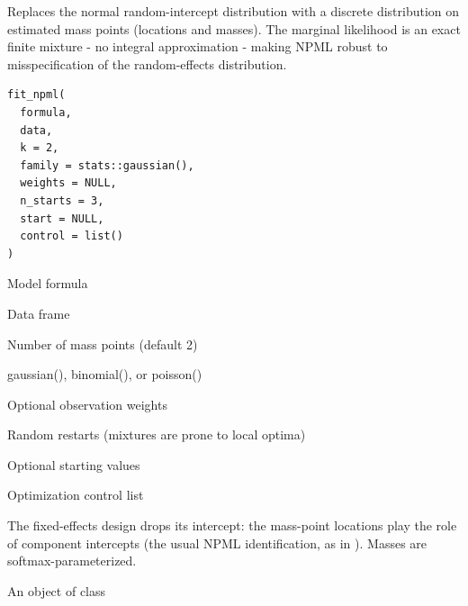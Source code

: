 \documentclass[a4paper]{book}
\begin{document}
%
\begin{Description}
Replaces the normal random-intercept distribution with a discrete
distribution on  estimated mass points (locations and masses).
The marginal likelihood is an exact finite mixture - no integral
approximation - making NPML robust to misspecification of the
random-effects distribution.
\end{Description}
%
\begin{Usage}
\begin{verbatim}
fit_npml(
  formula,
  data,
  k = 2,
  family = stats::gaussian(),
  weights = NULL,
  n_starts = 3,
  start = NULL,
  control = list()
)
\end{verbatim}
\end{Usage}
%
\begin{Arguments}
\begin{ldescription}
\item[\code{formula}] Model formula 

\item[\code{data}] Data frame

\item[\code{k}] Number of mass points (default 2)

\item[\code{family}] gaussian(), binomial(), or poisson()

\item[\code{weights}] Optional observation weights

\item[\code{n\_starts}] Random restarts (mixtures are prone to local optima)

\item[\code{start}] Optional starting values

\item[\code{control}] Optimization control list
\end{ldescription}
\end{Arguments}
%
\begin{Details}
The fixed-effects design drops its intercept: the mass-point locations
play the role of component intercepts (the usual NPML identification,
as in ). Masses are softmax-parameterized.
\end{Details}
%
\begin{Value}
An object of class 
\end{Value}
\end{document}

